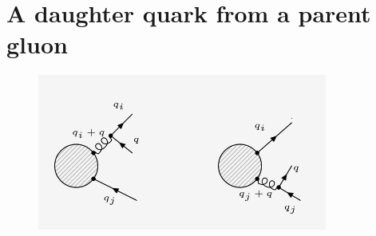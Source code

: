 \section{A daughter quark from a parent gluon}
\begin{figure}[ht!]
\centering
\includegraphics[width=0.85\textwidth]{images/QG/QGDiagrams.png}
\end{figure}

